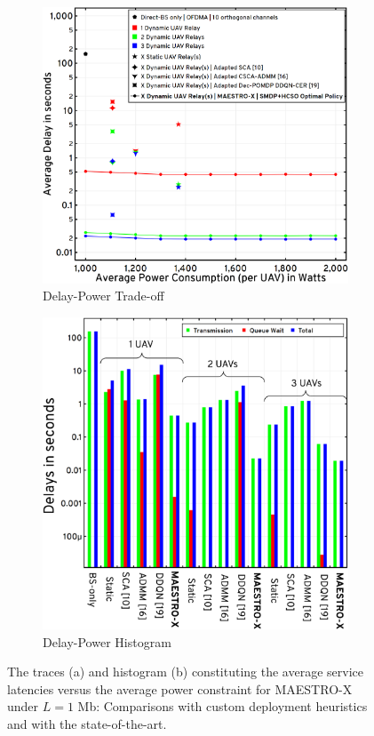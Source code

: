 \documentclass[10pt, twocolumn]{IEEEtran}
\theoremstyle{plain}
\theoremstyle{definition}
\theoremstyle{remark}
\begin{document}
\begin{figure} [t]
     \begin{subfigure}{0.53\linewidth}
         \centering
         \includegraphics[width=0.8\linewidth]{figs/Delay_Power_Tradeoff_1Mb.png}
         \caption{Delay-Power Trade-off}
         \label{F8}
     \end{subfigure}
     \begin{subfigure}{0.47\linewidth}
         \centering
         \includegraphics[width=0.8\linewidth]{figs/Delay_Power_Histogram_1Mb.png}
         \caption{Delay-Power Histogram}
         \label{F9}
     \end{subfigure}
     \caption{The traces (a) and histogram (b) constituting the average service latencies versus the average power constraint for MAESTRO-X under $L{=}1$ Mb: Comparisons with custom deployment heuristics and with the state-of-the-art.}
     \vspace{-6mm}
\end{figure}
\end{document}
